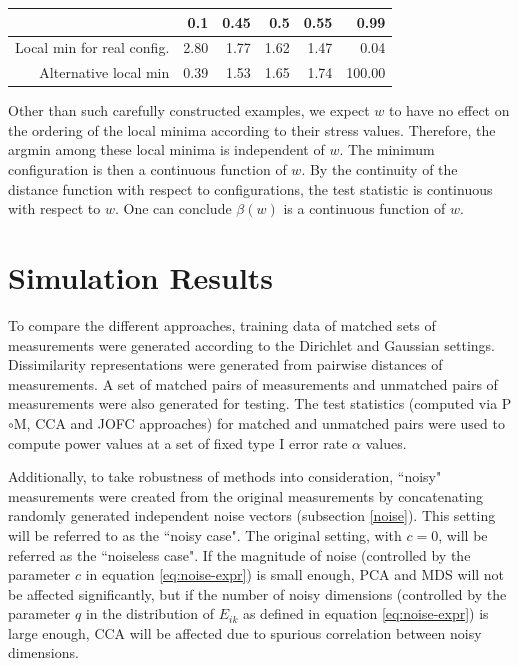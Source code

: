 \documentclass[11pt]{article} %
\begin{document}
\begin{table}[ht]
\begin{center}
\begin{tabular}{rrrrrr}
  \hline
 & 0.1 & 0.45 & 0.5 & 0.55 & 0.99 \\ 
  \hline
Local min for real config. & 2.80 & 1.77 & 1.62 & 1.47 & 0.04 \\ 
  Alternative local min & 0.39 & 1.53 & 1.65 & 1.74 & 100.00 \\ 
   \hline
\end{tabular}
\end{center}
\end{table}


Other than such carefully constructed examples, we expect $w$ to have no effect on the ordering of the local minima according to their stress values.
Therefore,  the argmin among these local minima is independent of $w$. The minimum configuration is then a continuous function of $w$. 
By the continuity of the distance function with respect to configurations, the test statistic is continuous with respect to $w$. One can conclude $\beta(w) $ is a continuous function of $w$. 

 



\section{Simulation Results\label{sec:Simulation Results}}
To compare the  different approaches, training data of matched sets of measurements were generated according to the Dirichlet and Gaussian settings. Dissimilarity representations were generated from pairwise distances of measurements. A set of matched pairs of measurements and unmatched pairs of measurements were also generated for testing. The test statistics (computed via P$\circ $M, CCA and JOFC approaches) for matched and unmatched pairs were used to compute power values at a set of fixed type I error rate $\alpha$ values.

 Additionally, to take robustness of methods into consideration, ``noisy" measurements were created from the original measurements by concatenating randomly generated independent noise vectors (subsection \ref{noise}).   This setting will be referred to as the ``noisy case". The original setting, with $c=0$,  will be referred as the ``noiseless case".
If the magnitude of noise (controlled by the parameter $c$ in equation \eqref{eq:noise-expr}) is small enough, PCA and MDS will not be affected significantly, but if the number of noisy dimensions (controlled by the parameter $q$ in the distribution of $E_{ik}$ as defined in equation \eqref{eq:noise-expr}) is large enough, CCA  will be affected due to spurious correlation between noisy dimensions.
\end{document}
